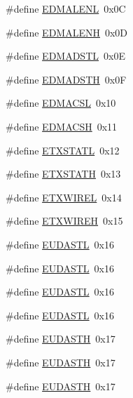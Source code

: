 \begin{DoxyCompactItemize}
\#define \mbox{\hyperlink{group___b_a_n_k__0_gaf30be38cc1ed90a3709b0f11535a8dc9}{E\+D\+M\+A\+L\+E\+NL}}~0x0C
\item 
\#define \mbox{\hyperlink{group___b_a_n_k__0_gafd6cf76dfdc8103ae66eba29abfcf3d4}{E\+D\+M\+A\+L\+E\+NH}}~0x0D
\item 
\#define \mbox{\hyperlink{group___b_a_n_k__0_ga6959cbf10d897b0eac13a15928f87cac}{E\+D\+M\+A\+D\+S\+TL}}~0x0E
\item 
\#define \mbox{\hyperlink{group___b_a_n_k__0_gab24279deee959774407b010264cb700a}{E\+D\+M\+A\+D\+S\+TH}}~0x0F
\item 
\#define \mbox{\hyperlink{group___b_a_n_k__0_ga9008ca9117933ffaed4f71a0c467ae07}{E\+D\+M\+A\+C\+SL}}~0x10
\item 
\#define \mbox{\hyperlink{group___b_a_n_k__0_ga8db6aa7fd9a0f04a045c04f67523621d}{E\+D\+M\+A\+C\+SH}}~0x11
\item 
\#define \mbox{\hyperlink{group___b_a_n_k__0_gafd8436b80e3fa21cdca1e6d5ce11f4dc}{E\+T\+X\+S\+T\+A\+TL}}~0x12
\item 
\#define \mbox{\hyperlink{group___b_a_n_k__0_ga5fbc1912d7029d08bdb8791ffbc802c4}{E\+T\+X\+S\+T\+A\+TH}}~0x13
\item 
\#define \mbox{\hyperlink{group___b_a_n_k__0_gaa853fd92f9994d3231ed888c11ea9a29}{E\+T\+X\+W\+I\+R\+EL}}~0x14
\item 
\#define \mbox{\hyperlink{group___b_a_n_k__0_ga7accec460eb38894636cfa7da5717252}{E\+T\+X\+W\+I\+R\+EH}}~0x15
\item 
\#define \mbox{\hyperlink{group___b_a_n_k__0_ga65db9065d0ca31bfd917b1433675fc5f}{E\+U\+D\+A\+S\+TL}}~0x16
\item 
\#define \mbox{\hyperlink{group___b_a_n_k__0_ga65db9065d0ca31bfd917b1433675fc5f}{E\+U\+D\+A\+S\+TL}}~0x16
\item 
\#define \mbox{\hyperlink{group___b_a_n_k__0_ga65db9065d0ca31bfd917b1433675fc5f}{E\+U\+D\+A\+S\+TL}}~0x16
\item 
\#define \mbox{\hyperlink{group___b_a_n_k__0_ga65db9065d0ca31bfd917b1433675fc5f}{E\+U\+D\+A\+S\+TL}}~0x16
\item 
\#define \mbox{\hyperlink{group___b_a_n_k__0_gae43040f2f496d1a975d51379d4ce5817}{E\+U\+D\+A\+S\+TH}}~0x17
\item 
\#define \mbox{\hyperlink{group___b_a_n_k__0_gae43040f2f496d1a975d51379d4ce5817}{E\+U\+D\+A\+S\+TH}}~0x17
\item 
\#define \mbox{\hyperlink{group___b_a_n_k__0_gae43040f2f496d1a975d51379d4ce5817}{E\+U\+D\+A\+S\+TH}}~0x17
\item 

\end{DoxyCompactItemize}
